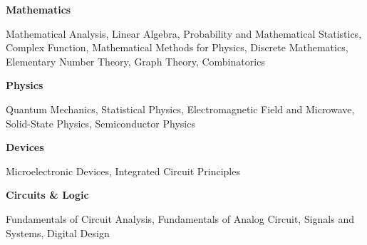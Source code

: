 
\newcommand{\levelentry}[1]{\item \textbf{#1}}
\newenvironment{cvcourses}
{
    \begin{cvlist}\item
    \small
}
{
    \normalsize
    \end{cvlist}
}

\begin{cvlist}
    \levelentry{Mathematics}
    \begin{cvcourses}
        Mathematical Analysis, Linear Algebra, Probability and Mathematical Statistics,
        Complex Function, Mathematical Methods for Physics,
        Discrete Mathematics, Elementary Number Theory, Graph Theory, Combinatorics
    \end{cvcourses}

    \levelentry{Physics}
    \begin{cvcourses}
        Quantum Mechanics, Statistical Physics, Electromagnetic Field and Microwave,
        Solid-State Physics, Semiconductor Physics
    \end{cvcourses}
    
    \levelentry{Devices}
    \begin{cvcourses}
        Microelectronic Devices, Integrated Circuit Principles
    \end{cvcourses}



    \levelentry{Circuits \& Logic}
    \begin{cvcourses}
        Fundamentals of Circuit Analysis, Fundamentals of Analog Circuit, Signals and Systems, Digital Design
    \end{cvcourses}


\end{cvlist}
